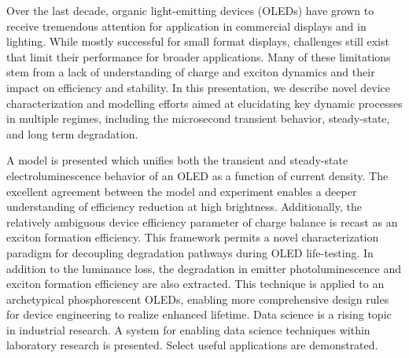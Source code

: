 \documentclass[../thesis.tex]{subfiles}
\begin{document}
Over the last decade, organic light-emitting devices (OLEDs) have grown to receive tremendous attention for application in commercial displays and in lighting.  While mostly successful for small format displays, challenges still exist that limit their performance for broader applications.  Many of these limitations stem from a lack of understanding of charge and exciton dynamics and their impact on efficiency and stability.  In this presentation, we describe novel device characterization and modelling efforts aimed at elucidating key dynamic processes in multiple regimes, including the microsecond transient behavior, steady-state, and long term degradation.  

A model is presented which unifies both the transient and steady-state electroluminescence behavior of an OLED as a function of current density.  The excellent agreement between the model and experiment enables a deeper understanding of efficiency reduction at high brightness.  Additionally, the relatively ambiguous device efficiency parameter of charge balance is recast as an exciton formation efficiency.  This framework permits a novel characterization paradigm for decoupling degradation pathways during OLED life-testing.  In addition to the luminance loss, the degradation in emitter photoluminescence and exciton formation efficiency are also extracted.  This technique is applied to an archetypical phosphorescent OLEDs, enabling more comprehensive design rules for device engineering to realize enhanced lifetime.  Data science is a rising topic in industrial research.  A system for enabling data science techniques within laboratory research is presented.  Select useful applications are demonstrated.
\end{document}
